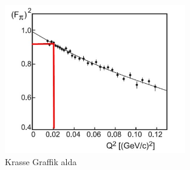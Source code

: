 \documentclass{subfiles}
\begin{document}
                \begin{figure}[H]
                        \centering
                        \includegraphics[width=0.7\textwidth]{Bilddateien/A1cGrafik.jpg}
                        \caption{Krasse Graffik alda}
                        \label{fig:A1cGrafik}
                \end{figure}

                
\end{document}
